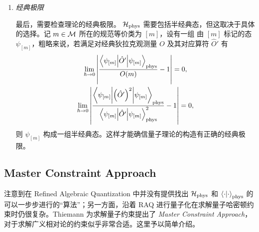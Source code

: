 \begin{enumerate}
			\item \emph{经典极限}
			
					最后，需要检查理论的经典极限。 $\mathcal{H}_{\text{phys}}$ 需要包括半经典态，但这取决于具体的选择。记 $m\in \mathcal{M}$ 所在的规范等价类为 $[m]$，设有一组 由 $[m]$ 标记的态 $\psi_{[m]}$，粗略来说，若满足对经典狄拉克观测量 $O$ 及其对应算符 $\hat{O}'$ 有
					\begin{gather}
						\lim_{\hbar \rightarrow 0} \abs{\frac{\ev**{\hat{O}'}{\psi_{[m]}}_{\text{phys}}}{O(m)} - 1} = 0,\\
						\lim_{\hbar \rightarrow 0} \abs{\frac{\ev**{\left( \hat{O}^\prime \right)^2}{\psi_{[m]}}_{\text{phys}}}{\ev**{\hat{O}^\prime}{\psi_{[m]}}_{\text{phys}}^2} - 1} = 0,
					\end{gather}
					则 $\psi_{[m]}$ 构成一组半经典态。这样才能确信量子理论的构造有正确的经典极限。
		\end{enumerate}

	\subsection{Master Constraint Approach}
		注意到在 Refined Algebraic Quantization 中并没有提供找出 $\mathcal{H}_{\text{phys}}$ 和 $\ip{\cdot}_{\text{phys}}$ 的可以一步步进行的“算法”；另一方面，沿着 RAQ 进行量子化在求解量子哈密顿约束时仍很复杂。Thiemann 为求解量子约束提出了 \emph{Master Constraint Approach}，对于求解广义相对论的约束似乎非常合适\cite{Thiemann2003zv}。这里予以简单介绍。

